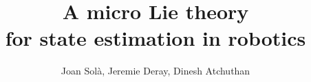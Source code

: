 \documentclass{IEEEtran}
\title{A micro Lie theory\\ for state estimation in robotics}
\author{Joan Sol\`a, Jeremie Deray, Dinesh Atchuthan}
\begin{document}
\maketitle











%


%
%
%
%




\begin{appendices}





\balance


\end{appendices}



\end{document}
